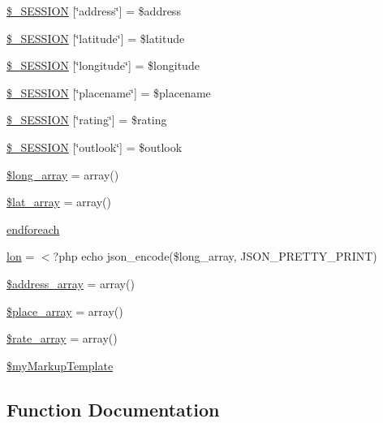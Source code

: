 \begin{DoxyCompactItemize}
\item 
\mbox{\hyperlink{location_8php_a8a5e05131617a16eedd7427eaf437329}{\$\+\_\+\+S\+E\+S\+S\+I\+ON}} \mbox{[}\char`\"{}address\char`\"{}\mbox{]} = \$address
\item 
\mbox{\hyperlink{location_8php_a399d6844a8329f151f8fc16af8ce3f57}{\$\+\_\+\+S\+E\+S\+S\+I\+ON}} \mbox{[}\char`\"{}latitude\char`\"{}\mbox{]} = \$latitude
\item 
\mbox{\hyperlink{location_8php_a92cb64f3b08cacc2f2e3eb4231d966b4}{\$\+\_\+\+S\+E\+S\+S\+I\+ON}} \mbox{[}\char`\"{}longitude\char`\"{}\mbox{]} = \$longitude
\item 
\mbox{\hyperlink{location_8php_acddeaa636a9daeb46d6c3b90710b06e1}{\$\+\_\+\+S\+E\+S\+S\+I\+ON}} \mbox{[}\char`\"{}placename\char`\"{}\mbox{]} = \$placename
\item 
\mbox{\hyperlink{location_8php_af0c8fc6207df0eb2b4e2b0badf84f944}{\$\+\_\+\+S\+E\+S\+S\+I\+ON}} \mbox{[}\char`\"{}rating\char`\"{}\mbox{]} = \$rating
\item 
\mbox{\hyperlink{location_8php_a6155e8ce48c8718260df3f8062aacef4}{\$\+\_\+\+S\+E\+S\+S\+I\+ON}} \mbox{[}\char`\"{}outlook\char`\"{}\mbox{]} = \$outlook
\item 
\mbox{\hyperlink{location_8php_a38f52f2d6c65f438e274d8664766df99}{\$long\+\_\+array}} = array()
\item 
\mbox{\hyperlink{location_8php_a5ad3d8dee8a4e075b6e08f71a9126b7b}{\$lat\+\_\+array}} = array()
\item 
\mbox{\hyperlink{location_8php_a672d9707ef91db026c210f98cc601123}{endforeach}}
\item 
\mbox{\hyperlink{location_8php_ab06a4b267b1033bd3d5ca43b757b7653}{lon}} = $<$?php echo json\+\_\+encode(\$long\+\_\+array, J\+S\+O\+N\+\_\+\+P\+R\+E\+T\+T\+Y\+\_\+\+P\+R\+I\+NT)
\item 
\mbox{\hyperlink{location_8php_a51d02f3943cb8a8e2ec0735c8e48ffb1}{\$address\+\_\+array}} = array()
\item 
\mbox{\hyperlink{location_8php_a82de05dbcc693b8360b6bf30353862ce}{\$place\+\_\+array}} = array()
\item 
\mbox{\hyperlink{location_8php_aa3e1691490aa8305c46d7bc7e0d7c9a4}{\$rate\+\_\+array}} = array()
\item 
\mbox{\hyperlink{location_8php_ad58b7d50a3bd82ab3735f8b74fbfccd2}{\$my\+Markup\+Template}}
\end{DoxyCompactItemize}


\subsection{Function Documentation}
\mbox{\label{location_8php_a94f49615449deadff259cd73979515b3}} 
